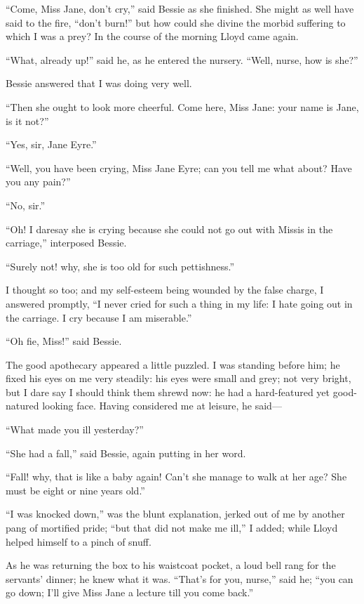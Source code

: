 \enquote{Come, Miss Jane, don't cry,} said Bessie as she finished.  She
might as well have said to the fire, \enquote{don't burn!} but how could
she divine the morbid suffering to which I was a prey?  In the course of
the morning \Mr{} Lloyd came again.

\enquote{What, already up!} said he, as he entered the nursery.
\enquote{Well, nurse, how is she?}

Bessie answered that I was doing very well.

\enquote{Then she ought to look more cheerful.  Come here, Miss Jane:
	your name is Jane, is it not?}

\enquote{Yes, sir, Jane Eyre.}

\enquote{Well, you have been crying, Miss Jane Eyre; can you tell me
	what about?  Have you any pain?}

\enquote{No, sir.}

\enquote{Oh!  I daresay she is crying because she could not go out with
	Missis in the carriage,} interposed Bessie.

\enquote{Surely not! why, she is too old for such pettishness.}

I thought so too; and my self-esteem being wounded by the false charge,
I answered promptly, \enquote{I never cried for such a thing in my life:
	I hate going out in the carriage.  I cry because I am miserable.}

\enquote{Oh fie, Miss!} said Bessie.

The good apothecary appeared a little puzzled.  I was standing before
him; he fixed his eyes on me very steadily: his eyes were small and
grey; not very bright, but I dare say I should think them shrewd now: he
had a hard-featured yet good-natured looking face.  Having considered me
at leisure, he said---

\enquote{What made you ill yesterday?}

\enquote{She had a fall,} said Bessie, again putting in her word.

\enquote{Fall! why, that is like a baby again!  Can't she manage to walk
	at her age?  She must be eight or nine years old.}

\enquote{I was knocked down,} was the blunt explanation, jerked out of
me by another pang of mortified pride; \enquote{but that did not make me
	ill,} I added; while \Mr{} Lloyd helped himself to a pinch of snuff.

As he was returning the box to his waistcoat pocket, a loud bell rang
for the servants' dinner; he knew what it was.  \enquote{That's for you,
	nurse,} said he; \enquote{you can go down; I'll give Miss Jane a lecture
	till you come back.}

